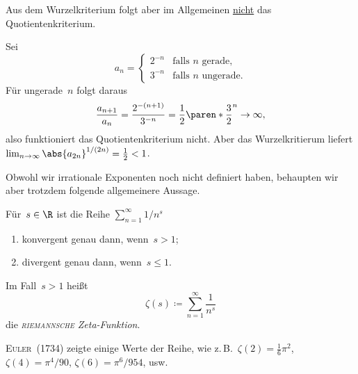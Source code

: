 \documentclass[a4paper]{article}
\begin{document}
Aus dem Wurzelkriterium folgt aber im Allgemeinen \underline{nicht} das Quotientenkriterium.

\begin{example}
    Sei
    \begin{equation*}
        a_n = \begin{cases}
            2^{-n} & \text{falls $n$ gerade},   \\
            3^{-n} & \text{falls $n$ ungerade}.
        \end{cases}
    \end{equation*}
    Für ungerade~$n$ folgt daraus
    \begin{equation*}
        \frac{a_{n+1}}{a_n} = \frac{2^{-(n+1)}}{3^{-n}} = \frac{1}{2} \paren*{\frac{3}{2}}^n \to \infty,
    \end{equation*}
    also funktioniert das Quotientenkriterium nicht. Aber das Wurzelkritierum liefert $\lim_{n\to\infty} \abs{a_{2n}}^{1/(2n)} = \frac{1}{2} < 1$.
\end{example}

Obwohl wir irrationale Exponenten noch nicht definiert haben, behaupten wir aber trotzdem folgende allgemeinere Aussage.

\begin{theorem}\label{thm:series:riemannzeta}
    Für~$s \in \R$ ist die Reihe $\sum_{n=1}^\infty 1/n^s$
    \begin{enumerate}
        \item konvergent genau dann, wenn~$s > 1$;
        \item divergent genau dann, wenn~$s \leq 1$.
    \end{enumerate}
\end{theorem}

\begin{notation}
    Im Fall~$s > 1$ heißt
    \begin{equation*}
        \zeta(s) \coloneqq \sum_{n=1}^\infty \frac{1}{n^s}
    \end{equation*}
    die \emph{\textsc{riemannsche} Zeta-Funktion}.
\end{notation}

\textsc{Euler}~(1734) zeigte einige Werte der Reihe, wie z.\,B.\ $\zeta(2) = \frac{1}{6} \pi^2$, $\zeta(4) = \pi^4/90$, $\zeta(6) = \pi^6/954$, usw.
\end{document}
